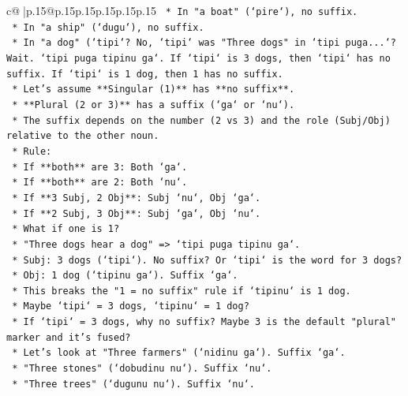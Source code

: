 \documentclass{article}
\begin{document}
{\begin{supertabular}{c@{$\;$}|p{.15\linewidth}@{}p{.15\linewidth}p{.15\linewidth}p{.15\linewidth}p{.15\linewidth}p{.15\linewidth}}
{{{\texttt{            *   In "a boat" (`pire`), no suffix.} \\
\texttt{            *   In "a ship" (`dugu`), no suffix.} \\
\texttt{            *   In "a dog" (`tipi`? No, `tipi` was "Three dogs" in `tipi puga...`? Wait. `tipi puga tipinu ga`. If `tipi` is 3 dogs, then `tipi` has no suffix. If `tipi` is 1 dog, then 1 has no suffix.} \\
\texttt{            *   Let's assume **Singular (1)** has **no suffix**.} \\
\texttt{            *   **Plural (2 or 3)** has a suffix (`ga` or `nu`).} \\
\texttt{            *   The suffix depends on the number (2 vs 3) and the role (Subj/Obj) relative to the other noun.} \\
\texttt{            *   Rule:} \\
\texttt{                *   If **both** are 3: Both `ga`.} \\
\texttt{                *   If **both** are 2: Both `nu`.} \\
\texttt{                *   If **3 Subj, 2 Obj**: Subj `nu`, Obj `ga`.} \\
\texttt{                *   If **2 Subj, 3 Obj**: Subj `ga`, Obj `nu`.} \\
\texttt{            *   What if one is 1?} \\
\texttt{                *   "Three dogs hear a dog" => `tipi puga tipinu ga`.} \\
\texttt{                    *   Subj: 3 dogs (`tipi`). No suffix? Or `tipi` is the word for 3 dogs?} \\
\texttt{                    *   Obj: 1 dog (`tipinu ga`). Suffix `ga`.} \\
\texttt{                    *   This breaks the "1 = no suffix" rule if `tipinu` is 1 dog.} \\
\texttt{                    *   Maybe `tipi` = 3 dogs, `tipinu` = 1 dog?} \\
\texttt{                    *   If `tipi` = 3 dogs, why no suffix? Maybe 3 is the default "plural" marker and it's fused?} \\
\texttt{                    *   Let's look at "Three farmers" (`nidinu ga`). Suffix `ga`.} \\
\texttt{                    *   "Three stones" (`dobudinu nu`). Suffix `nu`.} \\
\texttt{                    *   "Three trees" (`dugunu nu`). Suffix `nu`.} \\
}}}
\end{supertabular}}
\end{document}

